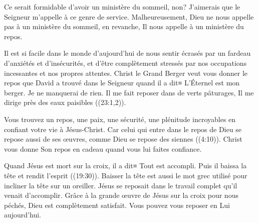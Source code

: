 

Ce serait formidable d'avoir un ministère du sommeil, non? J'aimerais que le Seigneur m'appelle à ce genre de service. Malheureusement, Dieu ne nous appelle pas à un ministère du sommeil, en revanche, Il nous appelle à un ministère du repos.

Il est si facile dans le monde d'aujourd'hui de nous sentir écrasés par un fardeau d'anxiétés et d'insécurités, et d'être complètement stressés par nos occupations incessantes et nos propres attentes. Christ le Grand Berger veut vous donner le repos que David a trouvé dans le Seigneur quand il a dit≡ \og L’Éternel est mon berger. Je ne manquerai de rien. Il me fait reposer dans de verts pâturages, Il me dirige près des eaux paisibles \fg{} ((23:1,2)).

Vous trouvez un repos, une paix, une sécurité, une plénitude incroyables en confiant votre vie à Jésus-Christ. \og Car celui qui entre dans le repos de Dieu se repose aussi de ses \oe{}uvres, comme Dieu se repose des siennes \fg{} ((4:10)). Christ vous donne Son repos en cadeau quand vous lui faites confiance.

Quand Jésus est mort sur la croix, il a dit≡ \og Tout est accompli. Puis il baissa la tête et rendit l’esprit \fg{} ((19:30)). \og Baisser la tête \fg{} est aussi le mot grec utilisé pour incliner la tête sur un oreiller. Jésus se reposait dans le travail complet qu'il venait d'accomplir. Grâce à la grande œuvre de Jésus sur la croix pour nous péchés, Dieu est complètement satisfait. Vous pouvez vous reposer en Lui aujourd'hui.

